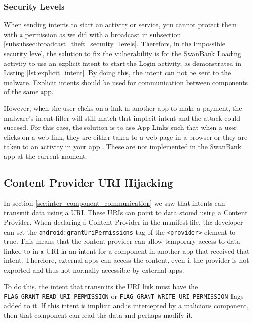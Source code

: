     \subsubsection{Security Levels}
        \label{subsubsec:activity_hijack_security_levels}
        
    When sending intents to start an activity or service, you cannot protect them with a permission as we did with a broadcast in subsection \ref{subsubsec:broadcast_theft_security_levels}. Therefore, in the Impossible security level, the solution to fix the vulnerability is for the SwanBank Loading activity to use an explicit intent to start the Login activity, as demonstrated in Listing \ref{lst:explicit_intent}. By doing this, the intent can not be sent to the malware. Explicit intents should be used for communication between components of the same app.

    However, when the user clicks on a link in another app to make a payment, the malware's intent filter will still match that implicit intent and the attack could succeed. For this case, the solution is to use App Links such that when a user clicks on a web link, they are either taken to a web page in a browser or they are taken to an activity in your app \cite{android_app_links}. These are not implemented in the SwanBank app at the current moment.
    
    \subsection{Content Provider URI Hijacking}
        \label{subsec:provider_uri_hijacking}
        
    In section \ref{sec:inter_component_communication} we saw that intents can transmit data using a URI. These URIs can point to data stored using a Content Provider. When declaring a Content Provider in the manifest file, the developer can set the \lstinline|android:grantUriPermissions| tag of the \lstinline|<provider>| element to true. This means that the content provider can allow temporary access to data linked to in a URI in an intent for a component in another app that received that intent. Therefore, external apps can access the content, even if the provider is not exported and thus not normally accessible by external apps.
    
    To do this, the intent that transmits the URI link must have the \lstinline|FLAG_GRANT_READ_URI_PERMISSION| or \lstinline|FLAG_GRANT_WRITE_URI_PERMISSION| flags added to it. If this intent is implicit and is intercepted by a malicious component, then that component can read the data and perhaps modify it.
    
